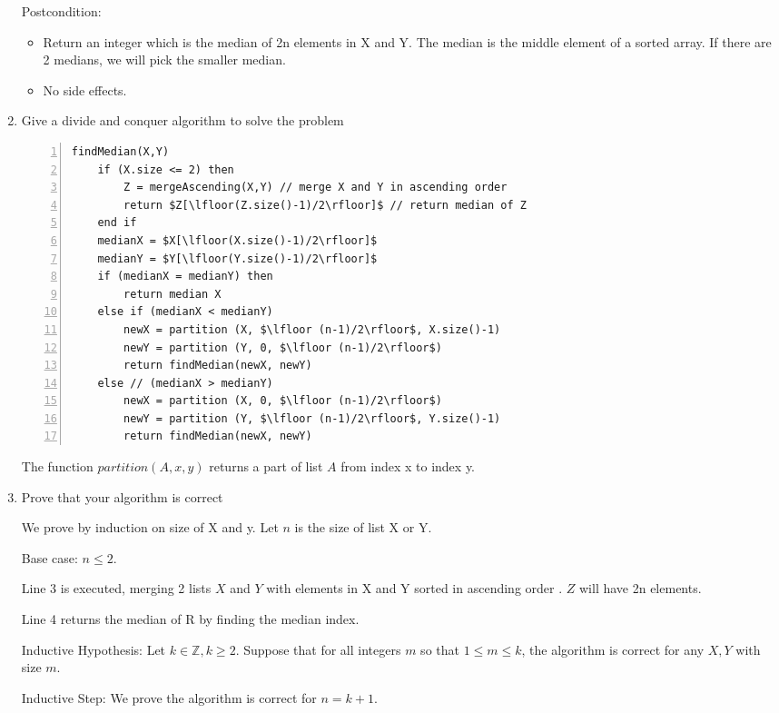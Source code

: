 \documentclass{cpsc413Solutions}
\begin{document}
\begin{problemlist}
\begin{problem}
\begin{enumerate}
    Postcondition:
    \begin{itemize}
        \item Return an integer which is the median of 2n elements in X and Y. The median is the middle element of a sorted array. If there are 2 medians, we will pick the smaller median. 
        \item No side effects.
    \end{itemize}

\newpage    
    \item Give a divide and conquer algorithm to solve the problem
    
    \begin{lstlisting}[numbers=left, mathescape=true]
    findMedian(X,Y)
    if (X.size <= 2) then
        Z = mergeAscending(X,Y) // merge X and Y in ascending order
        return $Z[\lfloor(Z.size()-1)/2\rfloor]$ // return median of Z
    end if
    medianX = $X[\lfloor(X.size()-1)/2\rfloor]$
    medianY = $Y[\lfloor(Y.size()-1)/2\rfloor]$
    if (medianX = medianY) then
        return median X
    else if (medianX < medianY)
        newX = partition (X, $\lfloor (n-1)/2\rfloor$, X.size()-1)
        newY = partition (Y, 0, $\lfloor (n-1)/2\rfloor$)
        return findMedian(newX, newY)
    else // (medianX > medianY)
        newX = partition (X, 0, $\lfloor (n-1)/2\rfloor$)
        newY = partition (Y, $\lfloor (n-1)/2\rfloor$, Y.size()-1)
        return findMedian(newX, newY)
    \end{lstlisting}
    
    The function $partition (A,x,y)$ returns a part of list $A$ from index x to index y. 
    
\newpage
\item Prove that your algorithm is correct

We prove by induction on size of X and y. Let $n$ is the size of list X or Y.

Base case: $n \leq 2$. 

Line 3 is executed, merging 2 lists $X$ and $Y$ with elements in X and Y sorted in ascending order . $Z$ will have 2n elements.

Line 4 returns the median of R by finding the median index.

Inductive Hypothesis: Let $k \in \mathds{Z}, k \geq 2$. Suppose that for all integers $m$ so that $1 \leq m \leq k$, the algorithm is correct for any $X,Y$ with size $m$.

Inductive Step: We prove the algorithm is correct for $n = k+1$.


\end{enumerate}
\end{problem}
\end{problemlist}
\end{document}
